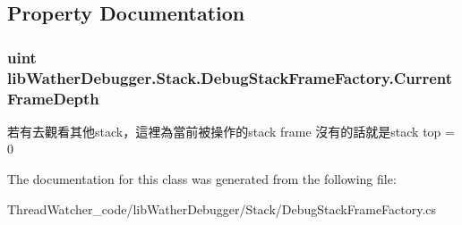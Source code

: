 \subsection{Property Documentation}
\hypertarget{classlib_wather_debugger_1_1_stack_1_1_debug_stack_frame_factory_a30a82a02252252bfcba80570c87acd36}{
\subsubsection[{Current\+Frame\+Depth}]{\setlength{\rightskip}{0pt plus 5cm}uint lib\+Wather\+Debugger.\+Stack.\+Debug\+Stack\+Frame\+Factory.\+Current\+Frame\+Depth\hspace{0.3cm}{\ttfamily [get]}}}\label{classlib_wather_debugger_1_1_stack_1_1_debug_stack_frame_factory_a30a82a02252252bfcba80570c87acd36}


若有去觀看其他stack，這裡為當前被操作的stack frame 沒有的話就是stack top = 0 



The documentation for this class was generated from the following file\+:\begin{DoxyCompactItemize}
\item 
Thread\+Watcher\+\_\+code/lib\+Wather\+Debugger/\+Stack/Debug\+Stack\+Frame\+Factory.\+cs\end{DoxyCompactItemize}
